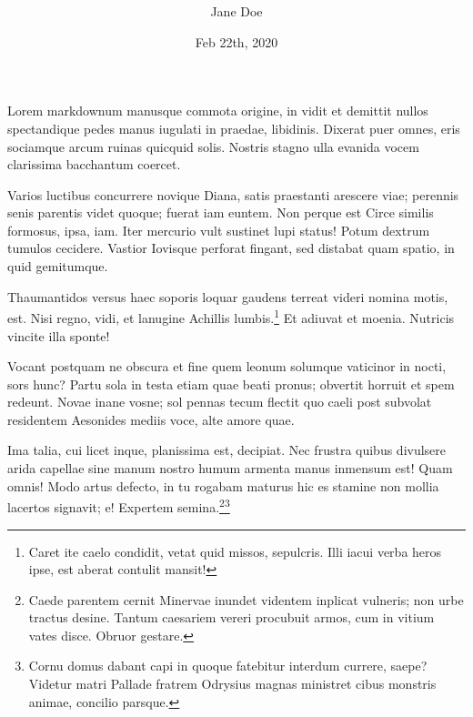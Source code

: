 \documentclass[%
    ]{scrartcl}
\title{~}
\author{Jane Doe}
\date{%
    Feb 22th, 2020 %
  }
\begin{document}






Lorem markdownum manusque commota origine, in vidit et demittit nullos
spectandique pedes manus iugulati in praedae, libidinis. Dixerat puer
omnes, eris sociamque arcum ruinas quicquid solis. Nostris stagno ulla
evanida vocem clarissima bacchantum coercet.

Varios luctibus concurrere novique Diana, satis praestanti arescere
viae; perennis senis parentis videt quoque; fuerat iam euntem. Non
perque est Circe similis formosus, ipsa, iam. Iter mercurio vult
sustinet lupi status! Potum dextrum tumulos cecidere. Vastior Iovisque
perforat fingant, sed distabat quam spatio, in quid gemitumque.

Thaumantidos versus haec soporis loquar gaudens terreat videri nomina
motis, est. Nisi regno, vidi, et lanugine Achillis lumbis.\footnote{Caret
  ite caelo condidit, vetat quid missos, sepulcris. Illi iacui verba
  heros ipse, est aberat contulit mansit!} Et adiuvat et moenia.
Nutricis vincite illa sponte!

Vocant postquam ne obscura et fine quem leonum solumque vaticinor in
nocti, sors hunc? Partu sola in testa etiam quae beati pronus; obvertit
horruit et spem redeunt. Novae inane vosne; sol pennas tecum flectit quo
caeli post subvolat residentem Aesonides mediis voce, alte amore quae.

Ima talia, cui licet inque, planissima est, decipiat. Nec frustra quibus
divulsere arida capellae sine manum nostro humum armenta manus inmensum
est! Quam omnis! Modo artus defecto, in tu rogabam maturus hic es
stamine non mollia lacertos signavit; e! Expertem
semina.\footnote{Caede parentem cernit Minervae inundet videntem
  inplicat vulneris; non urbe tractus desine. Tantum caesariem vereri
  procubuit armos, cum in vitium vates disce. Obruor gestare.}\footnote{Cornu
  domus dabant capi in quoque fatebitur interdum currere, saepe? Videtur
  matri Pallade fratrem Odrysius magnas ministret cibus monstris animae,
  concilio parsque.}
\end{document}
